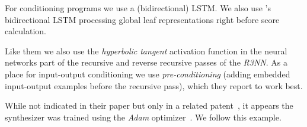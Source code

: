 \documentclass{article}
\begin{document}







For conditioning programs we use a (bidirectional) LSTM.
We also use \citet{nsps}'s bidirectional LSTM processing global leaf representations right before score calculation.

Like them we also use the \emph{hyperbolic tangent} activation function in the neural networks part of the recursive and reverse recursive passes of the \emph{R3NN}.
As a place for input-output conditioning we use \emph{pre-conditioning}
(adding embedded input-output examples before the recursive pass),
which they report to work best.

While not indicated in their paper but only in a related patent~\citep{mohamed2017neural},
it appears the synthesizer was trained using the \emph{Adam} optimizer~\citep{kingma2014adam}.
We follow this example.
\end{document}
